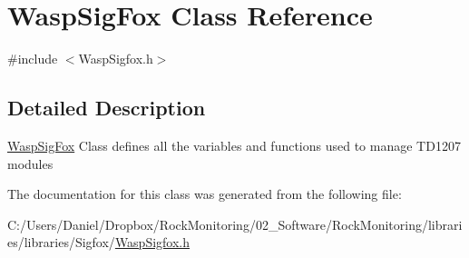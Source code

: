 \hypertarget{class_wasp_sig_fox}{}\section{Wasp\+Sig\+Fox Class Reference}
\label{class_wasp_sig_fox}


{\ttfamily \#include $<$Wasp\+Sigfox.\+h$>$}



\subsection{Detailed Description}
\hyperlink{class_wasp_sig_fox}{Wasp\+Sig\+Fox} Class defines all the variables and functions used to manage T\+D1207 modules 

The documentation for this class was generated from the following file\+:\begin{DoxyCompactItemize}
\item 
C\+:/\+Users/\+Daniel/\+Dropbox/\+Rock\+Monitoring/02\+\_\+\+Software/\+Rock\+Monitoring/libraries/libraries/\+Sigfox/\hyperlink{_wasp_sigfox_8h}{Wasp\+Sigfox.\+h}\end{DoxyCompactItemize}
